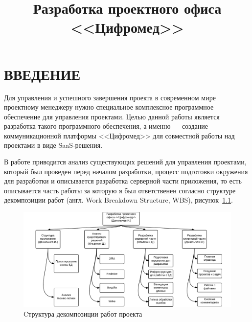 \documentclass[14pt, a4paper]{extreport}
\title{Разработка проектного офиса <<Цифромед>>}
\date{}
\begin{document}
\pagestyle{plain}

\renewcommand\abstractname{\MakeTextUppercase{Реферат}}



\newpage
\vspace*{-25mm}
\tableofcontents
\newpage


\chapter{\MakeTextUppercase{Введение}}
Для управления и успешного завершения проекта в современном мире проектному
менеджеру нужно специальное комплексное программное обеспечение для управления
проектами. Целью данной работы является разработка такого программного обеспечения,
а именно --- создание коммуникационной платформы <<Цифромед>> для совместной работы
над проектами в виде SaaS-решения.

В работе приводится анализ существующих решений для управления проектами, который
был проведен перед началом разработки, процесс подготовки окружения для разработки и описывается
разработка серверной части приложения, то есть описывается часть работы за которую я был ответственен
согласно структуре декомпозиции работ (англ. Work Breakdown Structure, WBS), рисунок~\ref{fig:wbo}.

\begin{figure}[!htb]
  \centering
    \includegraphics[scale=0.25]{../shared_images/wbs.png}
    \caption{Cтруктура декомпозиции работ проекта}
    \label{fig:wbo}
\end{figure}
\end{document}
